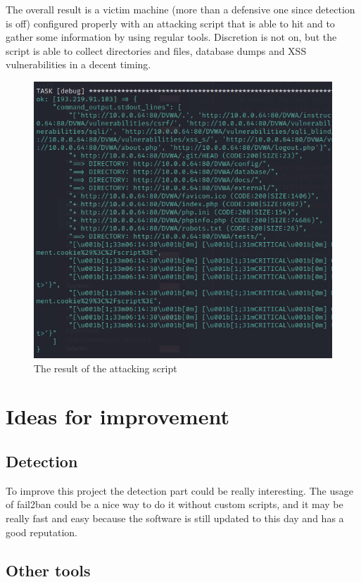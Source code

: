 \documentclass[a4paper,12pt,fleqn]{article}
\begin{document}
The overall result is a victim machine (more than a defensive one since detection is off) configured properly with an attacking script that is able to hit and to gather some information by using regular tools. Discretion is not on, but the script is able to collect directories and files, database dumps and XSS vulnerabilities in a decent timing. 

\begin{figure}[h]
    \centering
    \includegraphics[scale = 1]{images/general.png}
    \caption{The result of the attacking script}
\end{figure}

\section{Ideas for improvement}

\subsection{Detection}

To improve this project the detection part could be really interesting. The usage of fail2ban could be a nice way to do it without custom scripts, and it may be really fast and easy because the software is still updated to this day and has a good reputation.

\subsection{Other tools}
\end{document}
